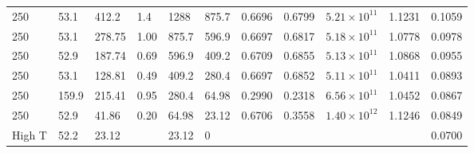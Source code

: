 \begin{chplandscape}
\begin{small}
\begin{longtable}{p{1.1cm}p{1.1cm}p{1.3cm}p{1.5cm}p{1.3cm}p{1.3cm}p{1.3cm}p{1.3cm}p{1.5cm}p{1.0cm}p{1.3cm}}
250 & 53.1 & 412.2 & 1.4 & 1288 & 875.7 & 0.6696 & 0.6799 & \(5.21\!\times\!10^{11}\) & 1.1231 & 0.1059 \\
250 & 53.1 & 278.75 & 1.00 & 875.7 & 596.9 & 0.6697 & 0.6817 & \(5.18\!\times\!10^{11}\) & 1.0778 & 0.0978 \\
250 & 52.9 & 187.74 & 0.69 & 596.9 & 409.2 & 0.6709 & 0.6855 & \(5.13\!\times\!10^{11}\) & 1.0868 & 0.0955 \\
250 & 53.1 & 128.81 & 0.49 & 409.2 & 280.4 & 0.6697 & 0.6852 & \(5.11\!\times\!10^{11}\) & 1.0411 & 0.0893 \\
250 & 159.9 & 215.41 & 0.95 & 280.4 & 64.98 & 0.2990 & 0.2318 & \(6.56\!\times\!10^{11}\) & 1.0452 & 0.0867 \\
250 & 52.9 & 41.86 & 0.20 & 64.98 & 23.12 & 0.6706 & 0.3558 & \(1.40\!\times\!10^{12}\) & 1.1246 & 0.0849 \\
High T & 52.2 & 23.12 &  & 23.12 & 0 &  &  &  &  & 0.0700 \\
\end{longtable}
\end{small}
\end{chplandscape}

\clearpage

